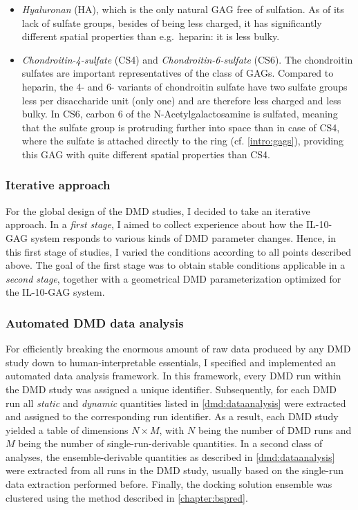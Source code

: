 \begin{itemize}
\begin{itemize}
\item \textit{Hyaluronan} (HA), which is the only natural GAG free of sulfation.
As of its lack of sulfate groups, besides of being less charged, it has
significantly different spatial properties than e.g.\ heparin: it is less bulky.

\item \textit{Chondroitin-4-sulfate} (CS4) and \textit{Chondroitin-6-sulfate}
(CS6). The chondroitin sulfates are important representatives of the class of
GAGs. Compared to heparin, the 4- and 6- variants of chondroitin sulfate have
two sulfate groups less per disaccharide unit (only one) and are therefore less
charged and less bulky. In CS6, carbon 6 of the N-Acetyl\-ga\-lacto\-sa\-mine is
sulfated, meaning that the sulfate group is protruding further into space than
in case of CS4, where the sulfate is attached directly to the ring (cf.
\cref{intro:gags}), providing this GAG with quite different spatial properties
than CS4.

\end{itemize}

\end{itemize}

\subsubsection{Iterative approach}

For the global design of the DMD studies, I decided to take an iterative
approach. In a \textit{first stage}, I aimed to collect experience about how the
IL-10-GAG system responds to various kinds of DMD parameter changes. Hence, in
this first stage of studies, I varied the conditions according to all points
described above. The goal of the first stage was to obtain stable conditions
applicable in a \textit{second stage}, together with a geometrical DMD
parameterization optimized for the IL-10-GAG system.


\subsubsection{Automated DMD data analysis}

For efficiently breaking the enormous amount of raw data produced by any DMD
study down to human-interpretable essentials, I specified and implemented an
automated data analysis framework. In this framework, every DMD run within the
DMD study was assigned a unique identifier. Subsequently, for each DMD run all
\textit{static} and \textit{dynamic} quantities listed in
\cref{dmd:dataanalysis} were extracted and assigned to the corresponding run
identifier. As a result, each DMD study yielded a table of dimensions $N \times
M$, with $N$ being the number of DMD runs and $M$ being the number of
single-run-derivable quantities. In a second class of analyses, the
ensemble-derivable quantities as described in \cref{dmd:dataanalysis} were
extracted from all runs in the DMD study, usually based on the single-run data
extraction performed before. Finally, the docking solution ensemble was
clustered using the method described in \cref{chapter:bspred}.

